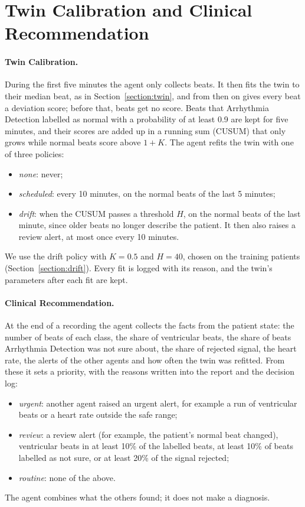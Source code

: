 \section{Twin Calibration and Clinical Recommendation}
\label{section:twinClinical}

\paragraph{Twin Calibration.} During the first five minutes the agent only collects beats. It then fits the twin to their median beat, as in Section~\ref{section:twin}, and from then on gives every beat a deviation score; before that, beats get no score. Beats that Arrhythmia Detection labelled as normal with a probability of at least 0.9 are kept for five minutes, and their scores are added up in a running sum (CUSUM) that only grows while normal beats score above $1 + K$. The agent refits the twin with one of three policies:
\begin{itemize}
	\item \emph{none}: never;
	\item \emph{scheduled}: every 10 minutes, on the normal beats of the last 5 minutes;
	\item \emph{drift}: when the CUSUM passes a threshold $H$, on the normal beats of the last minute, since older beats no longer describe the patient. It then also raises a review alert, at most once every 10 minutes.
\end{itemize}
We use the drift policy with $K = 0.5$ and $H = 40$, chosen on the training patients (Section~\ref{section:drift}). Every fit is logged with its reason, and the twin's parameters after each fit are kept.

\paragraph{Clinical Recommendation.} At the end of a recording the agent collects the facts from the patient state: the number of beats of each class, the share of ventricular beats, the share of beats Arrhythmia Detection was not sure about, the share of rejected signal, the heart rate, the alerts of the other agents and how often the twin was refitted. From these it sets a priority, with the reasons written into the report and the decision log:
\begin{itemize}
	\item \emph{urgent}: another agent raised an urgent alert, for example a run of ventricular beats or a heart rate outside the safe range;
	\item \emph{review}: a review alert (for example, the patient's normal beat changed), ventricular beats in at least 10\% of the labelled beats, at least 10\% of beats labelled as not sure, or at least 20\% of the signal rejected;
	\item \emph{routine}: none of the above.
\end{itemize}
The agent combines what the others found; it does not make a diagnosis.

